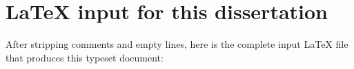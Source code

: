 
\chapter* {\LaTeX{} input for this dissertation}

After stripping comments and empty lines, here is the complete input
\LaTeX{} file that produces this typeset document:

\begin{footnotesize}
\end{footnotesize}
